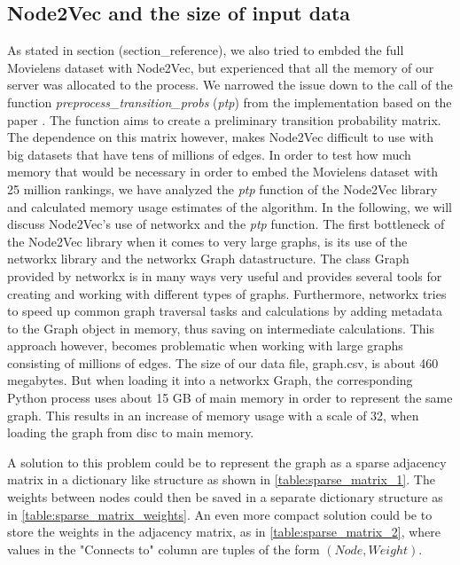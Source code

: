\subsection{Node2Vec and the size of input data}\label{AP:N2V}
As stated in section (section\_reference), we also tried to embded the full Movielens dataset with Node2Vec, but experienced that all the memory of our server was allocated to the process. We narrowed the issue down to the call of the function  \textit{preprocess\_transition\_probs} (\textit{ptp}) from the implementation based on the paper \cite{Node2vec}.
The function aims to create a preliminary transition probability matrix. The dependence on this matrix however, makes Node2Vec difficult to use with big datasets that have tens of millions of edges.
In order to test how much memory that would be necessary in order to embed the Movielens dataset with 25 million rankings, we have analyzed the \textit{ptp} function of the Node2Vec library and calculated memory usage estimates of the algorithm.
In the following, we will discuss Node2Vec's use of networkx and the \textit{ptp} function.
The first bottleneck of the Node2Vec library when it comes to very large graphs, is its use of the networkx library and the networkx Graph datastructure.
The class Graph provided by networkx is in many ways very useful and provides several tools for creating and working with different types of graphs. Furthermore, networkx tries to speed up common graph traversal tasks and calculations by adding metadata to the Graph object in memory, thus saving on intermediate calculations.
This approach however, becomes problematic when working with large graphs consisting of millions of edges.
The size of our data file, graph.csv, is about 460 megabytes. But when loading it into a networkx Graph, the corresponding Python process uses about 15 GB of main memory in order to represent the same graph.
This results in an increase of memory usage with a scale of 32, when loading the graph from disc to main memory.

A solution to this problem could be to represent the graph as a sparse adjacency matrix  in a dictionary like structure as shown in \autoref{table:sparse_matrix_1}.
The weights between nodes could then be saved in a separate dictionary structure as in \autoref{table:sparse_matrix_weights}.
An even more compact solution could be to store the weights in the adjacency matrix, as in \autoref{table:sparse_matrix_2}, where values in the "Connects to" column are tuples of the form $(Node, Weight)$.

